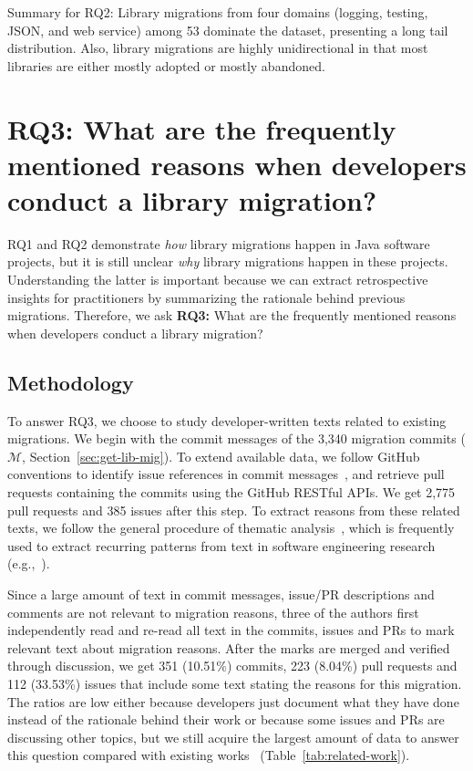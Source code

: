 \documentclass[sigconf, screen]{acmart}
\begin{document}
\begin{result-rq}{Summary for RQ2:}
Library migrations from four domains (logging, testing, JSON, and web service) among 53 dominate the dataset, presenting a long tail distribution.
Also, library migrations are highly unidirectional in that most libraries are either mostly adopted or mostly abandoned.
\end{result-rq}

\section{RQ3: What are the frequently mentioned reasons when developers conduct a library migration?}

RQ1 and RQ2 demonstrate \textit{how} library migrations happen in Java software projects, but it is still unclear \textit{why} library migrations happen in these projects.
Understanding the latter is important because we can extract retrospective insights for practitioners by summarizing the rationale behind previous migrations.
Therefore, we ask \textbf{RQ3:} What are the frequently mentioned reasons when developers conduct a library migration?

\subsection{Methodology}

To answer RQ3, we choose to study developer-written texts related to existing migrations.
We begin with the commit messages of the 3,340 migration commits ($\mathcal{M}$, Section~\ref{sec:get-lib-mig}).
To extend available data, we follow GitHub conventions to identify issue references in commit messages~\cite{github-issue-link}, and retrieve pull requests containing the commits using the GitHub RESTful APIs.
We get 2,775 pull requests and 385 issues after this step.
To extract reasons from these related texts, we follow the general procedure of thematic analysis~\cite{braun2012thematic, cruzes2011recommended}, which is frequently used to extract recurring patterns from text in software engineering research (e.g.,~\cite{silva2016we, coelho2017modern, tan2019communicate}).

Since a large amount of text in commit messages, issue/PR descriptions and comments are not relevant to migration reasons, three of the authors first independently read and re-read all text in the commits, issues and PRs to mark relevant text about migration reasons.
After the marks are merged and verified through discussion, we get 351 (10.51\%) commits, 223 (8.04\%) pull requests and 112 (33.53\%) issues that include some text stating the reasons for this migration.
The ratios are low either because developers just document what they have done instead of the rationale behind their work or because some issues and PRs are discussing other topics, but we still acquire the largest amount of data to answer this question compared with existing works~\cite{teyton2014study, kabinna2016logging} (Table~\ref{tab:related-work}).
\end{document}
